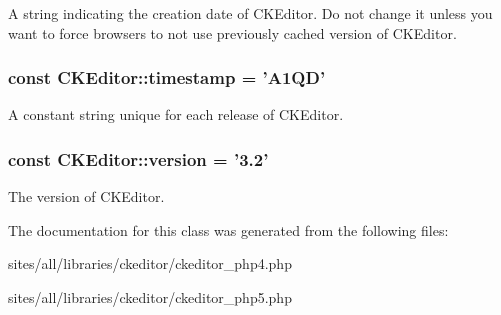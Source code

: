 A string indicating the creation date of CKEditor. Do not change it unless you want to force browsers to not use previously cached version of CKEditor. \hypertarget{classCKEditor_25b4e99a756a8c5d1dc101ecccecbcf7}{
\subsubsection[{timestamp}]{\setlength{\rightskip}{0pt plus 5cm}const {\bf CKEditor::timestamp} = 'A1QD'}}
\label{classCKEditor_25b4e99a756a8c5d1dc101ecccecbcf7}


A constant string unique for each release of CKEditor. \hypertarget{classCKEditor_f23ec1a6cfb30139f39bf4ffbc7d36d7}{
\subsubsection[{version}]{\setlength{\rightskip}{0pt plus 5cm}const {\bf CKEditor::version} = '3.2'}}
\label{classCKEditor_f23ec1a6cfb30139f39bf4ffbc7d36d7}


The version of CKEditor. 

The documentation for this class was generated from the following files:\begin{CompactItemize}
\item 
sites/all/libraries/ckeditor/ckeditor\_\-php4.php\item 
sites/all/libraries/ckeditor/ckeditor\_\-php5.php\end{CompactItemize}
